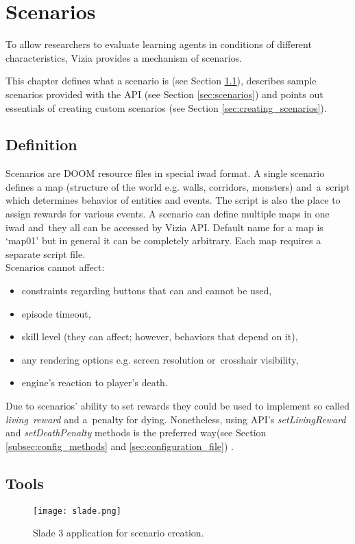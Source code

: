 \chapter{Scenarios}\label{ch:scenarios}

To allow researchers to evaluate learning agents in conditions of different characteristics, Vizia provides a mechanism of scenarios.

This chapter defines what a scenario is (see Section \ref{sec:scenario_definition}), describes sample scenarios provided with the API (see Section \ref{sec:scenarios}) and points out essentials of creating custom scenarios (see Section \ref{sec:creating_scenarios}).

\section{Definition}\label{sec:scenario_definition}
	Scenarios are DOOM resource files in special iwad format. A single scenario defines a map (structure of the world e.g. walls, corridors, monsters) and~a~script which determines behavior of entities and events. The script is also the place to assign rewards for various events. A scenario can define multiple maps in one iwad and~they all can be accessed by Vizia API. Default name for a map is `map01' but in general it can be completely arbitrary. Each map requires a separate script file.
	\\
	Scenarios cannot affect:
	\begin{itemize}
		\item constraints regarding buttons that can and cannot be used,
		\item episode timeout,
		\item skill level (they can affect; however, behaviors that depend on it),
		\item any rendering options e.g. screen resolution or~crosshair visibility,
		\item engine's reaction to player's death.
	\end{itemize}

	Due to scenarios' ability to set rewards they could be used to implement so called \emph{living~reward} and a~penalty for dying. Nonetheless, using API's \emph{setLivingReward} and \emph{setDeathPenalty} methods is the preferred way(see Section \ref{subsec:config_methods} and \ref{sec:configuration_file}) .

\section{Tools}\label{sec:tools}
	\begin{figure}
			\centering
			\texttt{[image: slade.png]}
			\caption{Slade 3 application for scenario creation.}\label{fig:slade}
	\end{figure}

